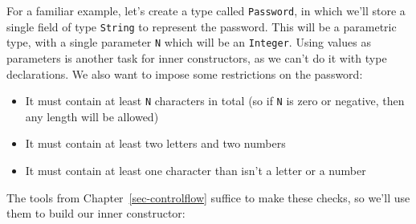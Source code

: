 \documentclass[
  letterpaper,
  DIV=11,
  numbers=noendperiod]{scrreprt}
\begin{document}
For a familiar example, let's create a type called \texttt{Password}, in
which we'll store a single field of type \texttt{String} to represent
the password. This will be a parametric type, with a single parameter
\texttt{N} which will be an \texttt{Integer}. Using values as parameters
is another task for inner constructors, as we can't do it with type
declarations. We also want to impose some restrictions on the password:

\begin{itemize}
\item
  It must contain at least \texttt{N} characters in total (so if
  \texttt{N} is zero or negative, then any length will be allowed)
\item
  It must contain at least two letters and two numbers
\item
  It must contain at least one character than isn't a letter or a number
\end{itemize}

The tools from Chapter~\ref{sec-controlflow} suffice to make these
checks, so we'll use them to build our inner constructor:
\end{document}
